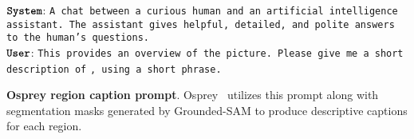\begin{table}[ht]
    \centering
    \begin{minipage}{0.99\columnwidth}\vspace{0mm}    \centering
    \begin{tcolorbox} 
        \raggedright
        \small
        $\texttt{\textbf{System}}$: \texttt{A chat between a curious human and an artificial intelligence assistant. The assistant gives helpful, detailed, and polite answers to the human's questions.} \\
        $\texttt{\textbf{User}}$:  \texttt{This provides an overview of the picture. Please give me a short description of}  \texttt{, using a short phrase.}
    \end{tcolorbox}
        \label{tab:osprey_prompt}
    \end{minipage}
    \caption{\textbf{Osprey region caption prompt}. Osprey~\cite{yuan2024osprey} utilizes this prompt along with segmentation masks generated by Grounded-SAM to produce descriptive captions for each region.}
    \vspace{-4mm}
\end{table}

